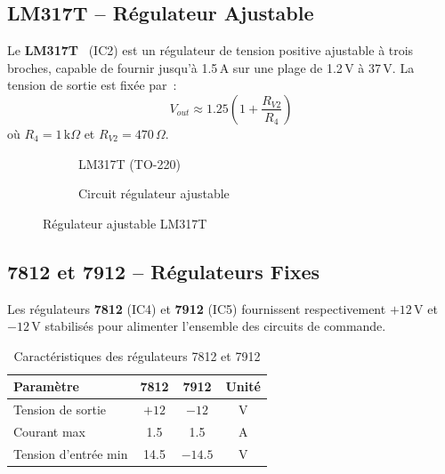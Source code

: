 \documentclass[a4paper,12pt,openany]{book}
\begin{document}
\subsection{LM317T -- R\'egulateur Ajustable}

Le \textbf{LM317T}~\cite{LM317DS} (IC2) est un r\'egulateur de tension
positive ajustable \`a trois broches, capable de fournir jusqu'\`a 1.5\,A
sur une plage de 1.2\,V \`a 37\,V. La tension de sortie est fix\'ee par~:
\begin{equation}
  V_{out} \approx 1.25 \left(1 + \frac{R_{V2}}{R_4}\right)
\end{equation}
o\`u $R_4 = 1\,\text{k}\Omega$ et $R_{V2} = 470\,\Omega$.

\begin{figure}[H]
  \centering
  \begin{subfigure}[b]{0.45\textwidth}
    \centering
    \caption{LM317T (TO-220)}
  \end{subfigure}
  \hfill
  \begin{subfigure}[b]{0.50\textwidth}
    \centering
    \caption{Circuit r\'egulateur ajustable}
  \end{subfigure}
  \caption{R\'egulateur ajustable LM317T}
  \label{fig:lm317}
\end{figure}

\subsection{7812 et 7912 -- R\'egulateurs Fixes}

Les r\'egulateurs \textbf{7812} (IC4) et \textbf{7912} (IC5) fournissent
respectivement $+12$\,V et $-12$\,V stabilis\'es pour alimenter l'ensemble
des circuits de commande.

\begin{table}[H]
  \centering
  \caption{Caract\'eristiques des r\'egulateurs 7812 et 7912}
  \begin{tabular}{|l|c|c|c|}
    \hline
    \textbf{Param\`etre} & \textbf{7812} & \textbf{7912} & \textbf{Unit\'e} \\
    \hline
    Tension de sortie     & $+12$  & $-12$  & V \\
    Courant max           & 1.5    & 1.5    & A \\
    Tension d'entr\'ee min & 14.5  & $-14.5$ & V \\
    \hline
  \end{tabular}
  \label{tab:7812}
\end{table}
\end{document}
